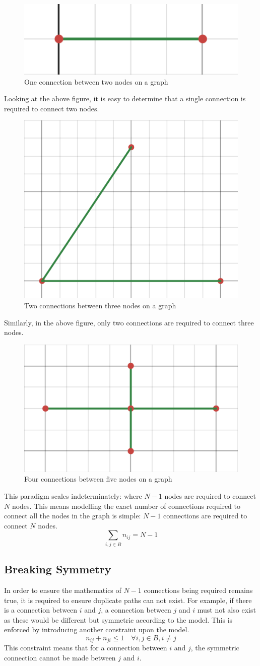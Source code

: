 \begin{figure}[H]
    \centering
    \includegraphics[width=0.35\linewidth]{twonodes.png}
    \caption{One connection between two nodes on a graph}
    \label{fig:Two Nodes}
\end{figure}

Looking at the above figure, it is easy to determine that a single connection is required to connect two nodes.

\begin{figure}[H]
    \centering
    \includegraphics[width=0.30\linewidth]{threenodes.png}
    \caption{Two connections between three nodes on a graph}
    \label{fig:Three Nodes}
\end{figure}

Similarly, in the above figure, only two connections are required to connect three nodes.
\begin{figure}[H]
    \centering
    \includegraphics[width=0.35\linewidth]{fivenodes.png}
    \caption{Four connections between five nodes on a graph}
    \label{fig:Five Nodes}
\end{figure}


This paradigm scales indeterminately: where $N-1$ nodes are required to connect $N$ nodes.
\newline
This means modelling the exact number of connections required to connect all the nodes in the graph is simple: $N-1$ connections are required to connect $N$ nodes.
\[
\sum_{i,j \in B}n_{ij} =N -1
\]
\subsection{Breaking Symmetry}\label{Breaking Symmetry}
In order to ensure the mathematics of $N-1$ connections being required remains true, it is required to ensure duplicate paths can not exist. For example, if there is a connection between $i$ and $j$, a connection between $j$ and $i$ must not also exist as these would be different but symmetric according to the model. This is enforced by introducing another constraint upon the model.
\newline
\[
n_{ij} + n_{ji} \le 1 \quad\forall i,j\in B, i \neq j
\]
This constraint means that for a connection between $i$ and $j$, the symmetric connection cannot be made between $j$ and $i$.
